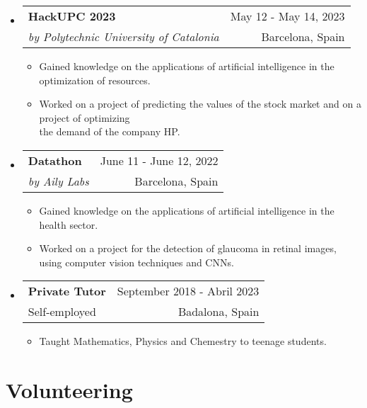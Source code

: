 \documentclass[a4paper,11pt]{article}
\makeatletter
\newcommand{\resumeQuadHeading}[4]{
  \item
  \begin{tabular*}{0.96\textwidth}[t]{l@{\extracolsep{\fill}}r}
    \textbf{#1} & \small #2 \\
    \small#3 & \small #4 \\
  \end{tabular*}
}
\newcommand{\resumeHeadingListStart}{
  \begin{itemize}[leftmargin=0.15in, label={}]
}
\newcommand{\resumeHeadingListEnd}{\end{itemize}}
\makeatother
\begin{document}
\resumeHeadingListStart{}
\resumeQuadHeading{HackUPC 2023}{May 12 - May 14, 2023}{\textit{by Polytechnic University of Catalonia}}{Barcelona, Spain}
\begin{itemize}[leftmargin=3em, itemsep=0.1em, topsep=2pt]
	\item \small Gained knowledge on the applications of artificial intelligence in the optimization of resources.
	\item \small Worked on a project of predicting the values of the stock market and on a project of optimizing\\ the demand of the company HP.
\end{itemize}
\resumeHeadingListEnd{}

\resumeHeadingListStart{}
\resumeQuadHeading{Datathon}{June 11 - June 12, 2022}{\textit{by Aily Labs}}{Barcelona, Spain}
\begin{itemize}[leftmargin=3em, itemsep=0.1em, topsep=2pt]
	\item \small Gained knowledge on the applications of artificial intelligence in the health sector.
	\item \small Worked on a project for the detection of glaucoma in retinal images, using computer vision tech\-niques and CNNs.
\end{itemize}
\resumeHeadingListEnd{}

\resumeHeadingListStart{}
\resumeQuadHeading{Private Tutor}{September 2018 - Abril 2023}
{Self-employed}{Badalona, Spain}
\begin{itemize}[leftmargin=3em, itemsep=0.1em, topsep=2pt]
	\item \small Taught Mathematics, Physics and Chemestry to teenage students.
\end{itemize}
\resumeHeadingListEnd{}

\section{Volunteering}
\end{document}
